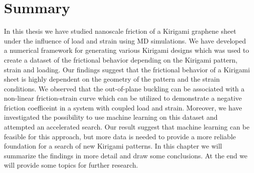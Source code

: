 \chapter{Summary}\label{chap:summary}

In this thesis we have studied nanoscale friction of a Kirigami graphene sheet
under the influence of load and strain using \acrshort{MD} simulations. We have
developed a numerical framework for generating various Kirigami designs which
was used to create a dataset of the frictional behavior depending on the
Kirigami pattern, strain and loading. Our findings suggest that the frictional
behavior of a Kirigami sheet is highly dependent on the geometry of the pattern
and the strain conditions. We observed that the out-of-plane buckling can be
associated with a non-linear friction-strain curve which can be utilized to
demonstrate a negative friction coefficeint in a system with coupled load and
strain. Moreover, we have investigated the possibility to use machine learning
on this dataset and attempted an accelerated search. Our result suggest that
machine learning can be feasible for this approach, but more data is needed to
provide a more reliable foundation for a search of new Kirigami patterns. In
this chapter we will summarize the findings in more detail and draw some conclusions. At the end we will provide some topics for further research.









